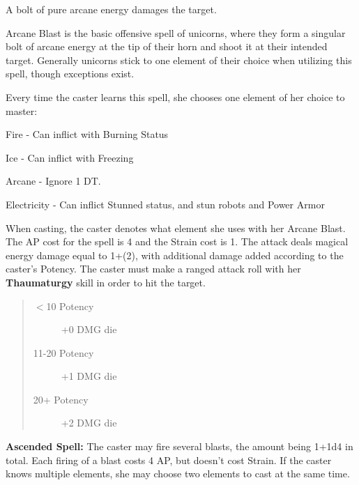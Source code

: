 \documentclass[11pt,a4paper,twocolumn]{book}
\begin{document}
\medskip

A bolt of pure arcane energy damages the target.

Arcane Blast is the basic offensive spell of unicorns, where they form a singular bolt of arcane energy at the tip of their horn and shoot it at their intended target. Generally unicorns stick to one element of their choice when utilizing this spell, though exceptions exist.

Every time the caster learns this spell, she chooses one element of her choice to master:

\medskip
\begin{compactitem}
	\item Fire - Can inflict with Burning Status
	\item Ice - Can inflict with Freezing
	\item Arcane - Ignore 1 DT.
	\item Electricity - Can inflict Stunned status, and stun robots and Power Armor
\end{compactitem}
\medskip

When casting, the caster denotes what element she uses with her Arcane Blast. The AP cost for the spell is 4 and the Strain cost is 1. The attack deals magical energy damage equal to 1+(2), with additional damage added according to the caster's Potency. The caster must make a ranged attack roll with her \textbf{Thaumaturgy} skill in order to hit the target. 

\begin{quote}
	\begin{description}
		\item[$<$10 Potency] 	+0 DMG die
		\item[11-20 Potency] 	+1 DMG die
		\item[20+ Potency] 	    +2 DMG die
	\end{description}	
\end{quote}

\textbf{Ascended Spell:} The caster may fire several blasts, the amount being 1+1d4 in total. Each firing of a blast costs 4 AP, but doesn't cost Strain. If the caster knows multiple elements, she may choose two elements to cast at the same time. 

\end{document}
